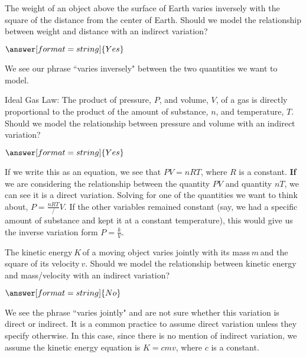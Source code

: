 \documentclass{ximera}
\begin{document}
\begin{question}
[Astronomy] The weight of an object above the surface of Earth varies inversely with the square of the distance from the center of Earth. Should we model the relationship between weight and distance with an indirect variation?

$\answer[format=string]{Yes}$

\begin{feedback}
We see our phrase ``varies inversely" between the two quantities we want to model. 
\end{feedback}
\end{question}


\begin{question}
[Chemistry] Ideal Gas Law: The product of pressure, $P$, and volume, $V$, of a gas is directly proportional to the product of the amount of substance, $n$, and temperature, $T$. Should we model the relationship between pressure and volume with an indirect variation?
	
$\answer[format=string]{Yes}$
	
\begin{feedback}
	If we write this as an equation, we see that $PV = nRT$, where $R$ is a constant. \textbf{If} we are considering the relationship between the quantity $PV$ and quantity $nT$, we can see it is a direct variation. Solving for one of the quantities we want to think about, $P = \frac{nRT}/{V}$. If the other variables remained constant (say, we had a specific amount of substance and kept it at a constant temperature), this would give us the inverse variation form $P = \frac{k}{V}$. 
\end{feedback}
\end{question}

\begin{question}
[Physics] The kinetic energy $K$ of a moving object varies jointly with its mass $m$ and the square of its velocity $v$. Should we model the relationship between kinetic energy and mass/velocity with an indirect variation?

$\answer[format=string]{No}$

\begin{feedback}
We see the phrase ``varies jointly" and are not sure whether this variation is direct or indirect. It is a common practice to assume direct variation unless they specify otherwise. In this case, since there is no mention of indirect variation, we assume the kinetic energy equation is $K = c mv$, where $c$ is a constant. 
\end{feedback}

\end{question}
\end{document}
